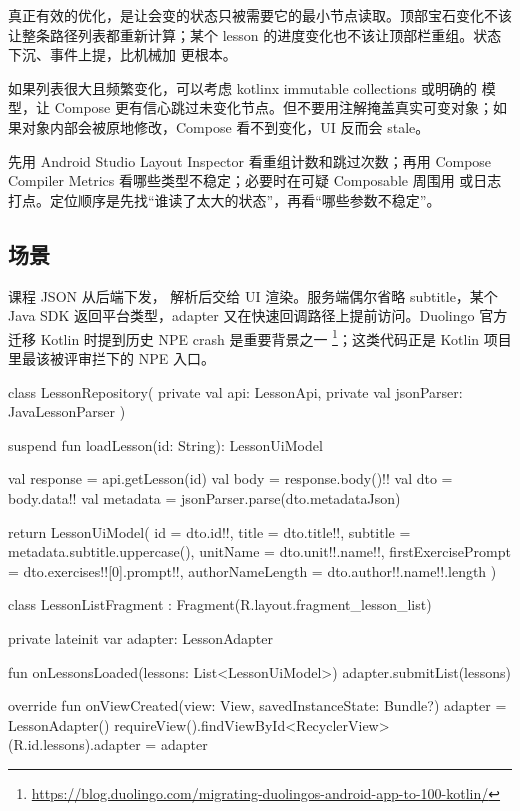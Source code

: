 \begin{idea}
真正有效的优化，是让会变的状态只被需要它的最小节点读取。顶部宝石变化不该让整条路径列表都重新计算；某个 lesson 的进度变化也不该让顶部栏重组。状态下沉、事件上提，比机械加  更根本。
\end{idea}

\begin{pitfall}[稳定集合不是语法糖]
如果列表很大且频繁变化，可以考虑 kotlinx immutable collections 或明确的  模型，让 Compose 更有信心跳过未变化节点。但不要用注解掩盖真实可变对象；如果对象内部会被原地修改，Compose 看不到变化，UI 反而会 stale。
\end{pitfall}

\begin{followup}[“怎么定位过度重组？”]
先用 Android Studio Layout Inspector 看重组计数和跳过次数；再用 Compose Compiler Metrics 看哪些类型不稳定；必要时在可疑 Composable 周围用  或日志打点。定位顺序是先找“谁读了太大的状态”，再看“哪些参数不稳定”。
\end{followup}


\subsection*{场景}
课程 JSON 从后端下发， 解析后交给 UI 渲染。服务端偶尔省略 subtitle，某个 Java SDK 返回平台类型，adapter 又在快速回调路径上提前访问。Duolingo 官方迁移 Kotlin 时提到历史 NPE crash 是重要背景之一 \srcofficial\footnote{\url{https://blog.duolingo.com/migrating-duolingos-android-app-to-100-kotlin/}}；这类代码正是 Kotlin 项目里最该被评审拦下的 NPE 入口。

\begin{ktbug}
class LessonRepository(
    private val api: LessonApi,
    private val jsonParser: JavaLessonParser
) {
    suspend fun loadLesson(id: String): LessonUiModel {
        val response = api.getLesson(id)
        val body = response.body()!!
        val dto = body.data!!
        val metadata = jsonParser.parse(dto.metadataJson)

        return LessonUiModel(
            id = dto.id!!,
            title = dto.title!!,
            subtitle = metadata.subtitle.uppercase(),
            unitName = dto.unit!!.name!!,
            firstExercisePrompt = dto.exercises!![0].prompt!!,
            authorNameLength = dto.author!!.name!!.length
        )
    }
}

class LessonListFragment : Fragment(R.layout.fragment_lesson_list) {
    private lateinit var adapter: LessonAdapter

    fun onLessonsLoaded(lessons: List<LessonUiModel>) {
        adapter.submitList(lessons)
    }

    override fun onViewCreated(view: View, savedInstanceState: Bundle?) {
        adapter = LessonAdapter()
        requireView().findViewById<RecyclerView>(R.id.lessons).adapter = adapter
    }
}
\end{ktbug}

